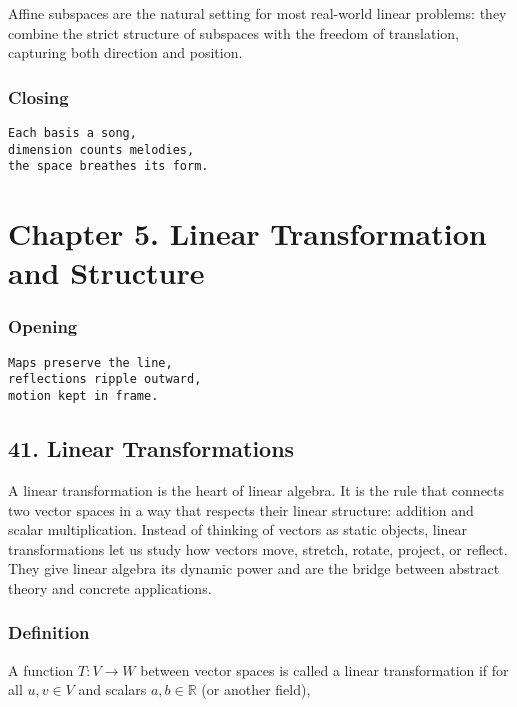 \documentclass[
  letterpaper,
  DIV=11,
  numbers=noendperiod]{scrreprt}
\begin{document}
Affine subspaces are the natural setting for most real-world linear
problems: they combine the strict structure of subspaces with the
freedom of translation, capturing both direction and position.

\subsubsection{Closing}\label{closing-3}

\begin{verbatim}
Each basis a song,
dimension counts melodies,
the space breathes its form.
\end{verbatim}

\section{Chapter 5. Linear Transformation and
Structure}\label{chapter-5.-linear-transformation-and-structure}

\subsubsection{Opening}\label{opening-3}

\begin{verbatim}
Maps preserve the line,
reflections ripple outward,
motion kept in frame.
\end{verbatim}

\subsection{41. Linear Transformations}\label{linear-transformations}

A linear transformation is the heart of linear algebra. It is the rule
that connects two vector spaces in a way that respects their linear
structure: addition and scalar multiplication. Instead of thinking of
vectors as static objects, linear transformations let us study how
vectors move, stretch, rotate, project, or reflect. They give linear
algebra its dynamic power and are the bridge between abstract theory and
concrete applications.

\subsubsection{Definition}\label{definition-2}

A function \(T: V \to W\) between vector spaces is called a linear
transformation if for all \(u, v \in V\) and scalars
\(a, b \in \mathbb{R}\) (or another field),
\end{document}
